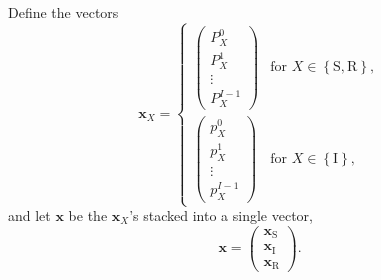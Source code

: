 \documentclass[12pt]{article}
\renewcommand{\vec}[1]{\mathbf{#1}}
\begin{document}
Define the vectors
\begin{equation}
  \vec{x}_X =
  \begin{cases}
    \begin{pmatrix}
      P_X^0\\
      P_X^1\\
      \vdots\\
      P_X^{I - 1}
    \end{pmatrix}
    &
    \text{for $X \in \left\{\mathrm{S}, \mathrm{R}\right\}$},
    \\[4em]
    \begin{pmatrix}
      p_X^0\\
      p_X^1\\
      \vdots\\
      p_X^{I - 1}
    \end{pmatrix}
    &
    \text{for $X \in \left\{\mathrm{I}\right\}$},
  \end{cases}
\end{equation}
and let $\vec{x}$ be the $\vec{x}_X$'s stacked into a single vector,
\begin{equation}
  \vec{x} =
  \begin{pmatrix}
    \vec{x}_{\mathrm{S}}\\
    \vec{x}_{\mathrm{I}}\\
    \vec{x}_{\mathrm{R}}
  \end{pmatrix}.
\end{equation}
\end{document}
